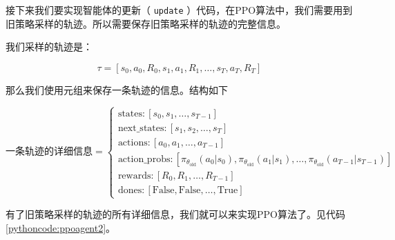 \documentclass[lang=cn,newtx,10pt,scheme=chinese]{elegantbook}
\newcommand{\py}[1]{%
  \colorbox{gray!10}{\texttt{#1}}%
}
\begin{document}
接下来我们要实现智能体的更新（\py{update}）代码，在PPO算法中，我们需要用到旧策略采样的轨迹。所以需要保存旧策略采样的轨迹的完整信息。

我们采样的轨迹是：

\begin{equation}
\tau = \left[ s_0, a_0, R_0, s_1, a_1, R_1, \dots, s_T, a_T, R_T \right]
\end{equation}

那么我们使用元组来保存一条轨迹的信息。结构如下

\begin{equation}
\text{一条轨迹的详细信息}
=
\begin{cases}
\text{states}: \left[ s_0, s_1, \dots, s_{T-1} \right] \\
\text{next\_states}: \left[ s_1, s_2, \dots, s_T \right] \\
\text{actions}: \left[ a_0, a_1, \dots, a_{T-1} \right] \\
\text{action\_probs}: \left[ \pi_{\theta_\text{old}}(a_0|s_0), \pi_{\theta_\text{old}}(a_1|s_1), \dots, \pi_{\theta_\text{old}}(a_{T-1}|s_{T-1}) \right] \\
\text{rewards}: \left[ R_0, R_1, \dots, R_{T-1} \right] \\
\text{dones}: \left[ \text{False}, \text{False}, \dots, \text{True} \right]
\end{cases}
\end{equation}

有了旧策略采样的轨迹的所有详细信息，我们就可以来实现PPO算法了。见代码\ref{pythoncode:ppoagent2}。
\end{document}
